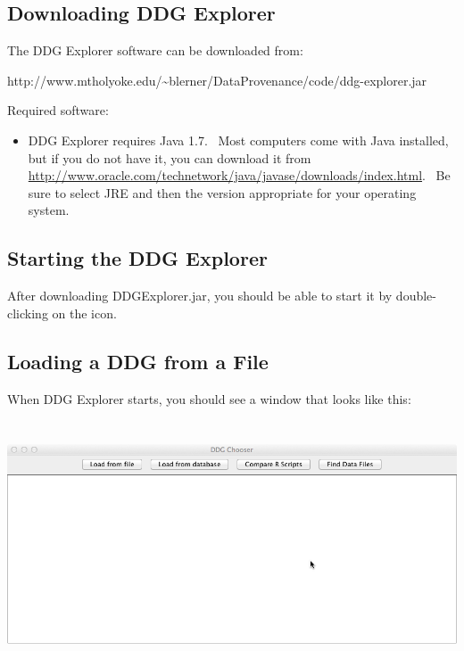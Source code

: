 \documentclass[letterpaper]{article}
\newcommand\liststyleWWviiiNumii{%
\renewcommand\labelitemi{•}
\renewcommand\labelitemii{•}
\renewcommand\labelitemiii{•}
\renewcommand\labelitemiv{•}
}
\begin{document}
\subsection{Downloading DDG Explorer}
{\mdseries\upshape\color{black}
The DDG Explorer software can be downloaded from:}

{\mdseries\upshape\color{black}
http://www.mtholyoke.edu/\~{}blerner/DataProvenance/code/ddg-explorer.jar}

{\mdseries\upshape\color{black}
Required software: \ }

\liststyleWWviiiNumii
\begin{itemize}
\item {\color{black}
DDG Explorer requires Java 1.7. \ Most computers come with Java installed, but if you do not have it, you can download it from \url{http://www.oracle.com/technetwork/java/javase/downloads/index.html}. \ Be sure to select JRE and then the version appropriate for your operating system.}
\end{itemize}
\subsection{Starting the DDG Explorer}
{\mdseries\upshape\color{black}
After downloading DDGExplorer.jar, you should be able to start it by double-clicking on the icon.}

\subsection{Loading a DDG from a File}
{\mdseries\upshape\color{black}
When DDG Explorer starts, you should see a window that looks like this:}

 \includegraphics[width=6.5in,height=2.889in]{UsingDDGExplorer-img/UsingDDGExplorer-img001.png} 
\end{document}
